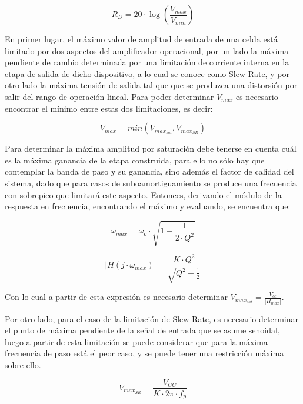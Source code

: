 \begin{equation}
R_D = 20 \cdot \log(\frac{V_{max}}{V_{min}})
\label{eq:rango_dinamico_sallen_key}
\end{equation}

En primer lugar, el m\'aximo valor de amplitud de entrada de una celda est\'a limitado por dos aspectos del amplificador operacional,
por un lado la m\'axima pendiente de cambio determinada por una limitaci\'on de corriente interna en la etapa de salida de dicho dispositivo,
a lo cual se conoce como Slew Rate, y por otro lado la m\'axima tensi\'on de salida tal que que se produzca una distorsi\'on por salir del rango de operaci\'on lineal.
Para poder determinar $V_{max}$ es necesario encontrar el m\'inimo entre estas dos limitaciones, es decir:

\begin{equation}
V_{max} = min(V_{max_{sat}},V_{max_{SR}})
\end{equation}

Para determinar la m\'axima amplitud por saturaci\'on debe tenerse en cuenta cu\'al es la m\'axima ganancia de la etapa construida,
para ello no s\'olo hay que contemplar la banda de paso y su ganancia, sino adem\'as el factor de calidad del sistema, dado que para casos
de suboamortiguamiento se produce una frecuencia con sobrepico que limitar\'a este aspecto. Entonces, derivando el m\'odulo de la respuesta en frecuencia,
encontrando el m\'aximo y evaluando, se encuentra que:

\begin{equation}
\omega_{max} = \omega_o \cdot \sqrt{1 - \frac{1}{2 \cdot Q^{2}}}
\end{equation}

\begin{equation}
|H(j \cdot \omega_{max})| = \frac{K \cdot Q^{2}}{ \sqrt{Q^{2} + \frac{1}{2}}}
\end{equation}

Con lo cual a partir de esta expresi\'on es necesario determinar $V_{max_{sat}} = \frac{V_{cc}}{|H_{max}|}$.

Por otro lado, para el caso de la limitaci\'on de Slew Rate, es necesario determinar el punto de m\'axima pendiente de la se\~nal de entrada que se asume senoidal,
luego a partir de esta limitaci\'on se puede considerar que para la m\'axima frecuencia de paso est\'a el peor caso, y se puede tener una restricci\'on m\'axima sobre ello.

\begin{equation}
V_{max_{SR}} = \frac{V_{CC}}{K \cdot 2 \pi \cdot f_p}
\end{equation}

